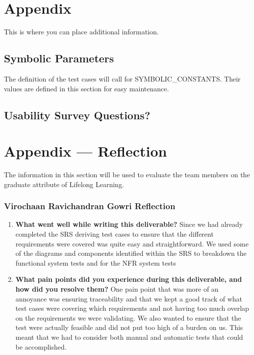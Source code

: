 \documentclass[12pt, titlepage]{article}
\begin{document}





\newpage

\section{Appendix}

This is where you can place additional information.

\subsection{Symbolic Parameters}

The definition of the test cases will call for SYMBOLIC\_CONSTANTS.
Their values are defined in this section for easy maintenance.

\subsection{Usability Survey Questions?}


\newpage{}
\section*{Appendix --- Reflection}

The information in this section will be used to evaluate the team members on the
graduate attribute of Lifelong Learning.

% 
\subsubsection*{Virochaan Ravichandran Gowri Reflection}
\begin{enumerate}
  \item \textbf{What went well while writing this deliverable?} 
  Since we had already completed the SRS deriving test cases to ensure that the different requirements were covered was quite easy and straightforward. We used some of the diagrams and components identified within the SRS to breakdown the functional system tests and for the NFR system tests 
  \item \textbf{What pain points did you experience during this deliverable, and how did you resolve them?}
  One pain point that was more of an annoyance was ensuring traceability and that we kept a good track of what test cases were covering which requirements and not having too much overlap on the requirements we were validating. We also wanted to ensure that the test were actually feasible and did not put too high of a burden on us. This meant that we had to consider both manual and automatic tests that could be accomplished. 
\end{enumerate}
\end{document}
